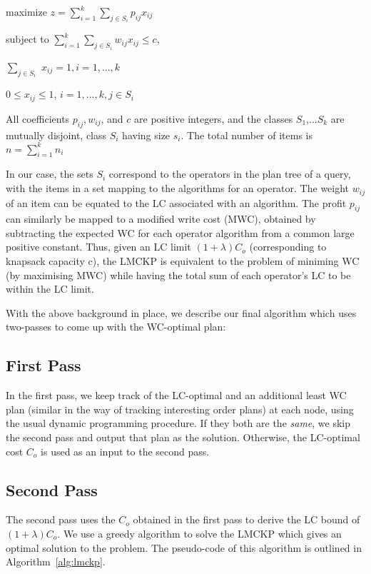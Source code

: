 \documentclass{article}
\begin{document}
maximize $z = \sum\limits_{i=1}^{k} \sum\limits_{j \in S_i}p_{ij} x_{ij}$

subject to $\sum\limits_{i=1}^{k} \sum\limits_{j \in S_i}w_{ij}  x_{ij} \le c$,

$\sum\limits_{j \in S_i}$    $ x_{ij} = 1, i = 1,...,k$

$0 \le x_{ij} \le 1$, $i = 1,...,k, j \in S_i$

All coefficients $p_{ij}, w_{ij}$, and $c$ are positive integers, and the
classes $S_1$,...$S_k$ are mutually disjoint, class $S_i$ having size $s_i$.
The total number of items is $n = \sum\limits_{i=1}^{k} n_i$

In our case, the sets $S_i$ correspond to the operators in the plan tree of a
query, with the items in a set mapping to the algorithms for an operator.  The
weight $w_{ij}$ of an item can be equated to the LC associated with an
algorithm. The profit $p_{ij}$ can similarly be mapped to a modified write cost
(MWC), obtained by subtracting the expected WC for each operator algorithm from
a common large positive constant.  Thus, given an LC limit $(1+\lambda)C_o$
(corresponding to knapsack capacity c), the LMCKP is equivalent to   the
problem of miniming WC (by maximising MWC) while having the total sum of each
operator's LC  to be within the LC limit.

With the above background in place, we describe our final algorithm which uses
two-passes to come up with the WC-optimal plan:

\subsection*{First Pass} In the first pass, we keep track of the LC-optimal and
an additional least WC plan (similar in the way of tracking interesting order
plans) at each node, using the usual dynamic programming procedure. If they
both are the \emph{same}, we skip the second pass and output that plan as the
solution. Otherwise, the LC-optimal cost $C_o$ is used as an input to the
second pass.

\subsection*{Second Pass} The second pass uses the $C_o$ obtained in the first
pass to derive the LC bound of $(1+\lambda)C_o$.  We use a greedy algorithm to
solve the LMCKP \cite{lmckp} which gives an optimal solution to the problem.  
The pseudo-code of this algorithm is outlined in Algorithm~\ref{alg:lmckp}. 
\end{document}
